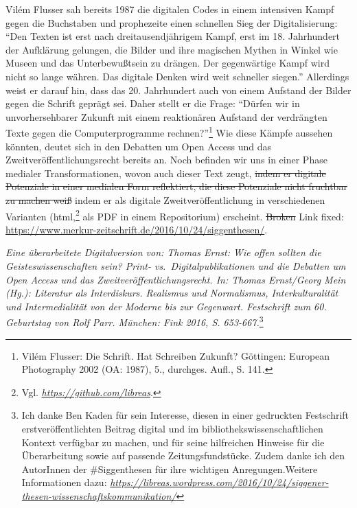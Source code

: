 \documentclass[a4paper,
fontsize=11pt,
oneside,
numbers=noperiodatend,
parskip=half-,
bibliography=totoc,
final
]{scrartcl}
\begin{document}
Vilém Flusser sah bereits 1987 die digitalen Codes in einem intensiven
Kampf gegen die Buchstaben und prophezeite einen schnellen Sieg der
Digitalisierung: \enquote{Den Texten ist erst nach dreitausendjährigem
Kampf, erst im 18. Jahrhundert der Aufklärung gelungen, die Bilder und
ihre magischen Mythen in Winkel wie Museen und das Unterbewußtsein zu
drängen. Der gegenwärtige Kampf wird nicht so lange währen. Das digitale
Denken wird weit schneller siegen.} Allerdings weist er darauf hin, dass
das 20. Jahrhundert auch von einem Aufstand der Bilder gegen die Schrift
geprägt sei. Daher stellt er die Frage: \enquote{Dürfen wir in
unvorhersehbarer Zukunft mit einem reaktionären Aufstand der verdrängten
Texte gegen die Computerprogramme rechnen?}\footnote{Vilém Flusser: Die
  Schrift. Hat Schreiben Zukunft? Göttingen: European Photography 2002
  (OA: 1987), 5., durchges. Aufl., S. 141.} Wie diese Kämpfe aussehen
könnten, deutet sich in den Debatten um Open Access und das
Zweitveröffentlichungsrecht bereits an. Noch befinden wir uns in einer
Phase medialer Transformationen, wovon auch dieser Text zeugt,
\sout{indem
er digitale Potenziale in einer medialen Form reflektiert, die diese
Potenziale nicht fruchtbar zu machen weiß} indem er als digitale
Zweitveröffentlichung in verschiedenen Varianten (html,\footnote{Vgl.
  \href{https://github.com/libreas}{\emph{https://github.com/libreas}}.}
als PDF in einem Repositorium) erscheint. \sout{Broken} Link fixed:
\url{https://www.merkur-zeitschrift.de/2016/10/24/siggenthesen/}.

\emph{Eine überarbeitete Digitalversion von: Thomas Ernst: Wie offen
sollten die Geisteswissenschaften sein? Print- vs.~Digitalpublikationen
und die Debatten um Open Access und das Zweitveröffentlichungsrecht. In:
Thomas Ernst/Georg Mein (Hg.): Literatur als Interdiskurs. Realismus und
Normalismus, Interkulturalität und Intermedialität von der Moderne bis
zur Gegenwart. Festschrift zum 60. Geburtstag von Rolf Parr. München:
Fink 2016, S. 653-667.}\footnote{Ich danke Ben Kaden für sein Interesse,
  diesen in einer gedruckten Festschrift erstveröffentlichten Beitrag
  digital und im bibliothekswissenschaftlichen Kontext verfügbar zu
  machen, und für seine hilfreichen Hinweise für die Überarbeitung sowie
  auf passende Zeitungsfundstücke. Zudem danke ich den AutorInnen der
  \#Siggenthesen für ihre wichtigen Anregungen.Weitere Informationen
  dazu:
  \href{https://libreas.wordpress.com/2016/10/24/siggener-thesen-wissenschaftskommunikation/}{\emph{https://libreas.wordpress.com/2016/10/24/siggener-thesen-wissenschaftskommunikation/}}}

\end{document}
